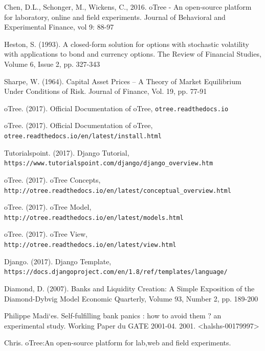 
\begin{thebibliography}{XX}
	
 Chen, D.L., Schonger, M., Wickens, C., 2016. oTree - An open-source platform for laboratory, online and field experiments. Journal of Behavioral and Experimental Finance, vol 9: 88-97

 Heston, S. (1993). A closed-form solution for options with stochastic volatility with applications to bond and currency options.
The Review of Financial Studies, Volume 6, Issue 2, pp. 327-343

 Sharpe, W. (1964). Capital Asset Prices -- A Theory of Market Equilibrium Under Conditions of Risk. Journal of Finance, Vol. 19, pp. 77-91

 oTree. (2017). Official Documentation of oTree, \verb|otree.readthedocs.io|

 oTree. (2017). Official Documentation of oTree,\\ \verb|otree.readthedocs.io/en/latest/install.html|

 Tutorialspoint. (2017). Django Tutorial,\\ \verb|https://www.tutorialspoint.com/django/django_overview.htm|

 oTree. (2017). oTree Concepts,\\ \verb|http://otree.readthedocs.io/en/latest/conceptual_overview.html|

 oTree. (2017). oTree Model,\\ \verb|http://otree.readthedocs.io/en/latest/models.html|

 oTree. (2017). oTree View,\\ \verb|http://otree.readthedocs.io/en/latest/view.html|

 Django. (2017). Django Template,\\ \verb|https://docs.djangoproject.com/en/1.8/ref/templates/language/|

 Diamond, D. (2007). Banks and Liquidity Creation: A Simple Exposition of the Diamond-Dybvig Model 
Economic Quarterly, Volume 93, Number 2, pp. 189-200

 Philippe Madi`es. Self-fulfilling bank panics : how to avoid them ? an experimental study.
Working Paper du GATE 2001-04. 2001. <halshs-00179997>

 Chris. oTree:An open-source platform for lab,web and field experiments.


\end{thebibliography}



